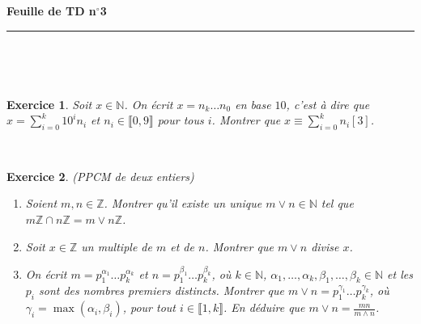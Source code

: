 \documentclass[11pt,a4paper]{article}
\title{}
\date{}
\newtheorem{ex}{Exercice}
\newcommand{\HRule}{\rule{\linewidth}{0.5mm}}
\newcommand{\N}{\mathbb{N}}
\newcommand{\Z}{\mathbb{Z}}
\begin{document}
\pagestyle{fancy}

\fancyhead{}
 \fancyfoot{}


\newcommand{\lb}{\llbracket}
\newcommand{\rb}{\rrbracket}


\newcommand{\md}[3]{#1\ \equiv \ #2 \! \! \! \! \! \pmod {#3} }
\newcommand{\nmd}[3]{#1 \not \equiv #2 \! \! \! \! \!  \pmod {#3} }
\newcommand{\mda}[3]{#1 \equiv #2 \! \!  \pmod {#3} }
\newcommand{\nmda}[3]{#1 \not \equiv #2 \! \! \pmod {#3} }
\newcommand{\mo}[2]{#1 \! \! \! \! \! \pmod #2 }
\newcommand{\moa}[2]{#1 \! \!  \pmod {#2} }


\thispagestyle{fancy}

\begin{center}
    { \huge \bfseries
    Feuille de TD n$^{\boldsymbol{\circ}}$3
     \\ [0cm] }
    \HRule \\[0.5cm]
\end{center}






\


\begin{ex}\label{Critere_divisibilite}
Soit $x\in \N$. On écrit $x=n_k\ldots n_0$ en base $10$, c'est à dire que $x=\sum_{i=0}^k 10^i n_i$ et $n_i\in \llbracket 0,9\rrbracket$ pour tous $i$. Montrer que $x\equiv \sum_{i=0}^k n_i[3]$.

\end{ex}





\


\begin{ex}\label{ppcm}(PPCM de deux entiers)
\begin{enumerate}

\item Soient $m,n\in \Z$. Montrer qu'il existe un unique $m\vee n\in \N$ tel que $m\Z\cap n\Z=m\vee n \Z$.

\item Soit $x\in \Z$ un multiple de $m$ et de $n$. Montrer que $m\vee n$ divise $x$.

\item On écrit $m=p_1^{\alpha_1}\ldots p_k^{\alpha_k}$ et $n=p_1^{\beta_1}\ldots p_k^{\beta_k}$,  où $k\in \N$, $\alpha_1,\ldots,\alpha_k,\beta_1,\ldots,\beta_k\in \N$ et les $p_i$ sont des nombres premiers distincts. Montrer que $m\vee n=p_1^{\gamma_1}\ldots p_k^{\gamma_k}$, où $\gamma_i=\max(\alpha_i,\beta_i)$, pour tout $i\in \llbracket 1,k\rrbracket$. En déduire que $m\vee n=\frac{mn}{m\wedge n}$.

\end{enumerate}
\end{ex}
\end{document}

